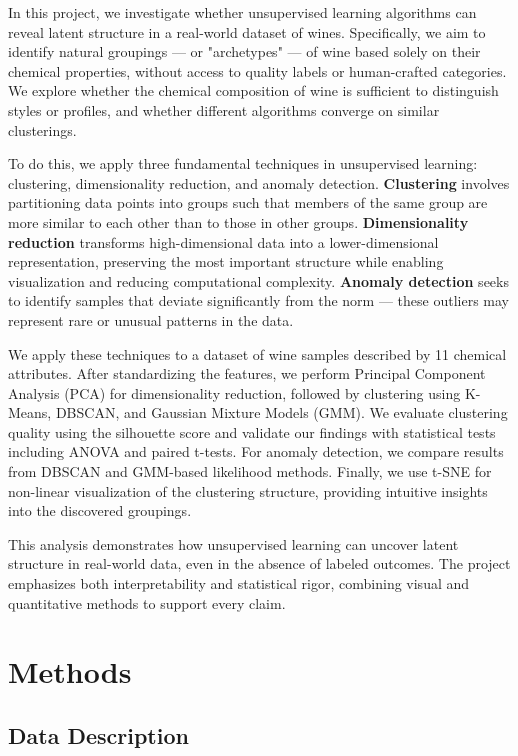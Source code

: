 \documentclass[12pt]{article}
\begin{document}
In this project, we investigate whether unsupervised learning algorithms can reveal latent structure in a real-world dataset of wines. Specifically, we aim to identify natural groupings — or "archetypes" — of wine based solely on their chemical properties, without access to quality labels or human-crafted categories. We explore whether the chemical composition of wine is sufficient to distinguish styles or profiles, and whether different algorithms converge on similar clusterings.

To do this, we apply three fundamental techniques in unsupervised learning: clustering, dimensionality reduction, and anomaly detection.
\textbf{Clustering} involves partitioning data points into groups such that members of the same group are more similar to each other than to those in other groups. \textbf{Dimensionality reduction} transforms high-dimensional data into a lower-dimensional representation, preserving the most important structure while enabling visualization and reducing computational complexity. 
\textbf{Anomaly detection} seeks to identify samples that deviate significantly from the norm — these outliers may represent rare or unusual patterns in the data.

We apply these techniques to a dataset of wine samples described by 11 chemical attributes. After standardizing the features, we perform Principal Component Analysis (PCA) for dimensionality reduction, followed by clustering using K-Means, DBSCAN, and Gaussian Mixture Models (GMM). We evaluate clustering quality using the silhouette score and validate our findings with statistical tests including ANOVA and paired t-tests. For anomaly detection, we compare results from DBSCAN and GMM-based likelihood methods. Finally, we use t-SNE for non-linear visualization of the clustering structure, providing intuitive insights into the discovered groupings.

This analysis demonstrates how unsupervised learning can uncover latent structure in real-world data, even in the absence of labeled outcomes. The project emphasizes both interpretability and statistical rigor, combining visual and quantitative methods to support every claim.


\section{Methods}

\subsection*{Data Description}
\end{document}
